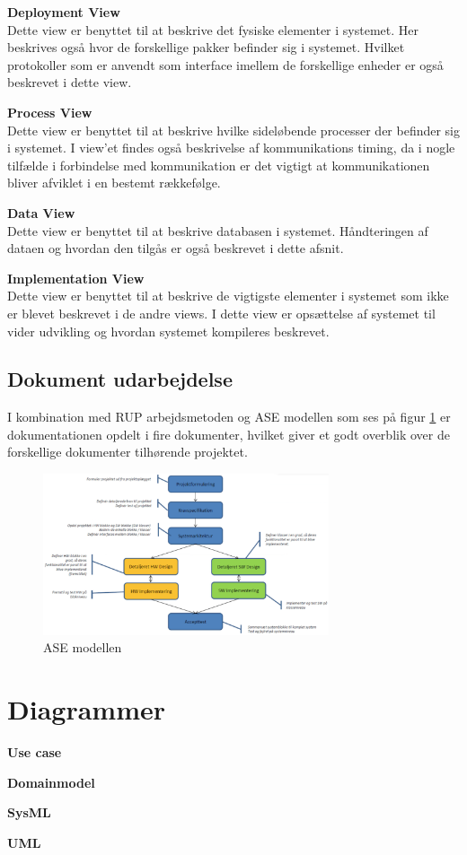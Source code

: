 \textbf{Deployment View}\\
Dette view er benyttet til at beskrive det fysiske elementer i systemet. Her beskrives også hvor de forskellige pakker befinder sig i systemet. Hvilket protokoller som er anvendt som interface imellem de forskellige enheder er også beskrevet i dette view.

\textbf{Process View}\\
Dette view er benyttet til at beskrive hvilke sideløbende processer der befinder sig i systemet. I view'et findes også beskrivelse af kommunikations timing, da i nogle tilfælde i forbindelse med kommunikation er det vigtigt at kommunikationen bliver afviklet i en bestemt rækkefølge.

\textbf{Data View}\\
Dette view er benyttet til at beskrive databasen i systemet. Håndteringen af dataen og hvordan den tilgås er også beskrevet i dette afsnit. 

\textbf{Implementation View}\\
Dette view er benyttet til at beskrive de vigtigste elementer i systemet som ikke er blevet beskrevet i de andre views. I dette view er opsættelse af systemet til vider udvikling og hvordan systemet kompileres beskrevet.

\subsection{Dokument udarbejdelse}
I kombination med RUP arbejdsmetoden og ASE modellen som ses på figur \ref{fig:dokument_udvikling} er dokumentationen opdelt i fire dokumenter, hvilket giver et godt overblik over de forskellige dokumenter tilhørende projektet. 

\begin{figure}[H]
	\centering
	\includegraphics[width=0.75\textwidth]{Billeder/Udviklingsproces/Dokument_udvikling}
	\caption{ASE modellen}
	\label{fig:dokument_udvikling}
\end{figure}



\section{Diagrammer}

\textbf{Use case}

\textbf{Domainmodel}

\textbf{SysML}

\textbf{UML}
